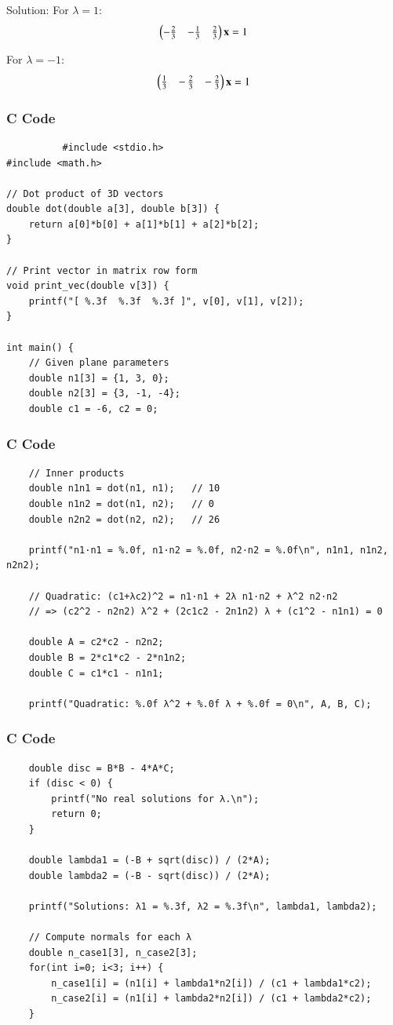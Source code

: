 \documentclass{beamer}
\begin{document}
\begin{frame}{Solution:}
For $\lambda=1$:
\begin{align}
\begin{pmatrix}-\tfrac{2}{3}&-\tfrac{1}{3}&\tfrac{2}{3}\end{pmatrix}\mathbf{x}=1
\end{align}

For $\lambda=-1$:
\begin{align}
\begin{pmatrix}\tfrac{1}{3}&-\,\tfrac{2}{3}&-\,\tfrac{2}{3}\end{pmatrix}\mathbf{x}=1
\end{align}

    
\end{frame}
\begin{frame}[fragile]
      \frametitle{C Code}
      \begin{lstlisting}
          #include <stdio.h>
#include <math.h>

// Dot product of 3D vectors
double dot(double a[3], double b[3]) {
    return a[0]*b[0] + a[1]*b[1] + a[2]*b[2];
}

// Print vector in matrix row form
void print_vec(double v[3]) {
    printf("[ %.3f  %.3f  %.3f ]", v[0], v[1], v[2]);
}

int main() {
    // Given plane parameters
    double n1[3] = {1, 3, 0};
    double n2[3] = {3, -1, -4};
    double c1 = -6, c2 = 0;
\end{lstlisting}
\end{frame}
\begin{frame}[fragile]
      \frametitle{C Code}
      \begin{lstlisting}
    // Inner products
    double n1n1 = dot(n1, n1);   // 10
    double n1n2 = dot(n1, n2);   // 0
    double n2n2 = dot(n2, n2);   // 26

    printf("n1·n1 = %.0f, n1·n2 = %.0f, n2·n2 = %.0f\n", n1n1, n1n2, n2n2);

    // Quadratic: (c1+λc2)^2 = n1·n1 + 2λ n1·n2 + λ^2 n2·n2
    // => (c2^2 - n2n2) λ^2 + (2c1c2 - 2n1n2) λ + (c1^2 - n1n1) = 0

    double A = c2*c2 - n2n2;
    double B = 2*c1*c2 - 2*n1n2;
    double C = c1*c1 - n1n1;

    printf("Quadratic: %.0f λ^2 + %.0f λ + %.0f = 0\n", A, B, C);
\end{lstlisting}
\end{frame}
\begin{frame}[fragile]
      \frametitle{C Code}
      \begin{lstlisting}
    double disc = B*B - 4*A*C;
    if (disc < 0) {
        printf("No real solutions for λ.\n");
        return 0;
    }

    double lambda1 = (-B + sqrt(disc)) / (2*A);
    double lambda2 = (-B - sqrt(disc)) / (2*A);

    printf("Solutions: λ1 = %.3f, λ2 = %.3f\n", lambda1, lambda2);

    // Compute normals for each λ
    double n_case1[3], n_case2[3];
    for(int i=0; i<3; i++) {
        n_case1[i] = (n1[i] + lambda1*n2[i]) / (c1 + lambda1*c2);
        n_case2[i] = (n1[i] + lambda2*n2[i]) / (c1 + lambda2*c2);
    }
\end{lstlisting}
\end{frame}
\end{document}
